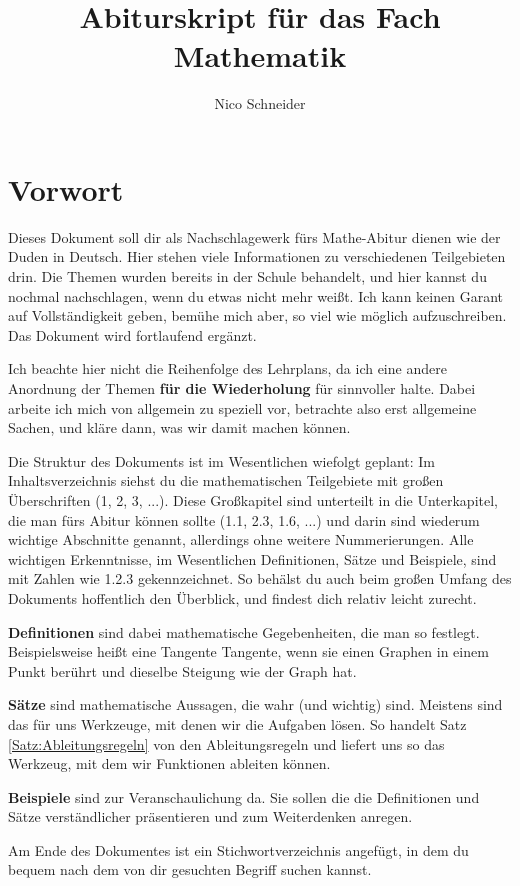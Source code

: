 \documentclass[ngerman, 12pt]{nssheetxea}
\begin{document}
\title{Abiturskript für das Fach Mathematik}
\author{Nico Schneider}

\maketitle

\newpage

\section*{Vorwort}

Dieses Dokument soll dir als Nachschlagewerk fürs Mathe-Abitur dienen wie der Duden in Deutsch. Hier stehen viele Informationen zu verschiedenen Teilgebieten drin. Die Themen wurden bereits in der Schule behandelt, und hier kannst du nochmal nachschlagen, wenn du etwas nicht mehr weißt. Ich kann keinen Garant auf Vollständigkeit geben, bemühe mich aber, so viel wie möglich aufzuschreiben. Das Dokument wird fortlaufend ergänzt. \par
Ich beachte hier nicht die Reihenfolge des Lehrplans, da ich eine andere Anordnung der Themen \textbf{für die Wiederholung} für sinnvoller halte. Dabei arbeite ich mich von allgemein zu speziell vor, betrachte also erst allgemeine Sachen, und kläre dann, was wir damit machen können. \par
Die Struktur des Dokuments ist im Wesentlichen wiefolgt geplant: Im Inhaltsverzeichnis siehst du die mathematischen Teilgebiete mit großen Überschriften (1, 2, 3, ...). Diese Großkapitel sind unterteilt in die Unterkapitel, die man fürs Abitur können sollte (1.1, 2.3, 1.6, ...) und darin sind wiederum wichtige Abschnitte genannt, allerdings ohne weitere Nummerierungen. Alle wichtigen Erkenntnisse, im Wesentlichen Definitionen, Sätze und Beispiele, sind mit Zahlen wie 1.2.3 gekennzeichnet. So behälst du auch beim großen Umfang des Dokuments hoffentlich den Überblick, und findest dich relativ leicht zurecht. \par
\textbf{Definitionen} sind dabei mathematische Gegebenheiten, die man so festlegt. Beispielsweise heißt eine Tangente Tangente, wenn sie einen Graphen in einem Punkt berührt und dieselbe Steigung wie der Graph hat. \par
\textbf{Sätze} sind mathematische Aussagen, die wahr (und wichtig) sind. Meistens sind das für uns Werkzeuge, mit denen wir die Aufgaben lösen. So handelt Satz \ref{Satz:Ableitungsregeln} von den Ableitungsregeln und liefert uns so das Werkzeug, mit dem wir Funktionen ableiten können. \par
\textbf{Beispiele} sind zur Veranschaulichung da. Sie sollen die die Definitionen und Sätze verständlicher präsentieren und zum Weiterdenken anregen. \par
Am Ende des Dokumentes ist ein Stichwortverzeichnis angefügt, in dem du bequem nach dem von dir gesuchten Begriff suchen kannst.
\newpage
\end{document}
